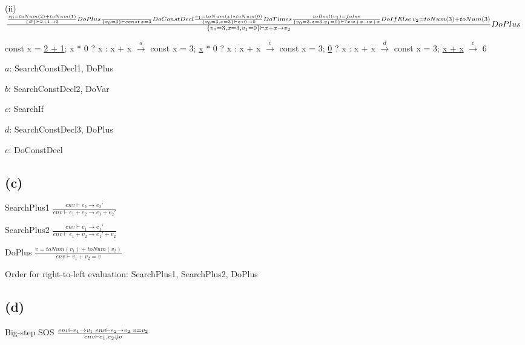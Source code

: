 \documentclass[11pt, oneside]{article}
\let\emptyset\varnothing
\newcommand{\forceindent}{\leavevmode{\parindent=1.5em\indent}}
\begin{document}
\vspace{1.5\baselineskip}

\par (ii)
$
\frac{
	\frac {
		v_0 = toNum(2) + toNum(1)
	}
	{
		\{\emptyset\} \vdash 2 + 1 \rightarrow 3
	} DoPlus
	\frac {
	}
	{
		\{v_0 = 3\} \vdash const \thinspace x = 3
	} DoConstDecl
	\frac {
		v_1 = toNum(x) * toNum(0)
	}
	{
		\{v_0 = 3, x = 3\} \vdash x * 0 \rightarrow 0
	} DoTimes
	\frac {
		toBool(v_1) = false
	}
	{
		\{v_0 = 3, x = 3, v_1 = 0\} \vdash ? x : x + x \rightarrow x + x
	} DoIfElse
	\thinspace
	v_2 = toNum(3) + toNum(3)
}{
	\{v_0 = 3, x = 3, v_1 = 0\} \vdash x + x \rightarrow v_2
} DoPlus
$

\vspace{1.5\baselineskip}

\par const x = \underline{2 + 1}; x * 0 ? x : x + x $\xrightarrow{a}$ const x = 3; \underline{x} * 0 ? x : x + x $\xrightarrow{c}$ const x = 3; \underline{0} ? x : x + x $\xrightarrow{d}$ const x = 3; \underline{x + x} $\xrightarrow{e}$ 6
\par $a$: SearchConstDecl1, DoPlus
\par $b$: SearchConstDecl2, DoVar
\par $c$: SearchIf
\par $d$: SearchConstDecl3, DoPlus
\par $e$: DoConstDecl

\subsection*{(c)}
\forceindent \par 
\par SearchPlus1
$
\frac{
	env \vdash e_2 \rightarrow e_2'
}
{
	env \vdash e_1 + e_2 \rightarrow e_1 + e_2'
}
$
\par SearchPlus2
$
\frac{
	env \vdash e_1 \rightarrow e_1'
}
{
	env \vdash e_1 + v_2 \rightarrow e_1' + v_2
}
$
\par DoPlus
$
\frac{
	v = toNum(v_1) + toNum(v_2)
}
{
	env \vdash v_1 + v_2 = v
}
$
\par Order for right-to-left evaluation: SearchPlus1, SearchPlus2, DoPlus

\subsection*{(d)}
\forceindent \par Big-step SOS
$
\frac{
	env \vdash e_1 \rightarrow v_1 \thinspace \thinspace env \vdash e_2 \rightarrow v_2 \thinspace \thinspace v = v_2
}
{
	env \vdash e_1, e_2 \Downarrow v
}
$
\end{document}
